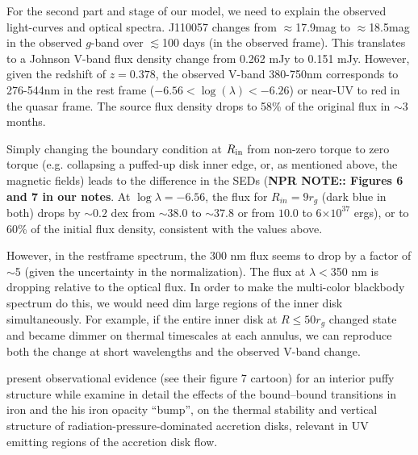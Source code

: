 \documentclass[11pt,a4paper]{article}
\begin{document}
For the second part and stage of our model, we need to explain the
observed light-curves and optical spectra. J110057 changes from
$\approx$17.9mag to $\approx$18.5mag in the observed $g$-band over
$\lesssim$100 days (in the observed frame).  This translates to a
Johnson V-band flux density change from 0.262 mJy to 0.151 mJy.
However, given the redshift of $z=0.378$, the observed V-band
380-750nm corresponds to 276-544nm in the rest frame ($-6.56 < \log
(\lambda) < -6.26$) or near-UV to red in the quasar frame. The source
flux density drops to 58\% of the original flux in $\sim$3 months.

Simply changing the boundary condition at $R_{\rm in}$ from non-zero
torque to zero torque (e.g. collapsing a puffed-up disk inner edge,
or, as mentioned above, the magnetic fields) leads to the difference
in the SEDs ({\bf NPR NOTE:: Figures 6 and 7 in our notes}.  At $\log
\lambda = −6.56$, the flux for $R_{in} = 9 r_{g}$ (dark blue in both)
drops by $\sim0.2$ dex from $\sim38.0$ to $\sim37.8 $ or from $10.0$
to 6$\times 10^{37}$ ergs), or to 60\% of the initial flux density,
consistent with the values above.

However, in the restframe spectrum, the 300 nm flux seems to drop by a
factor of $\sim$5 (given the uncertainty in the normalization). The
flux at $\lambda < $350 nm is dropping relative to the optical
flux. In order to make the multi-color blackbody spectrum do this, we
would need dim large regions of the inner disk simultaneously.  For
example, if the entire inner disk at $R \leq 50 r_{g}$ changed state
and became dimmer on thermal timescales at each annulus, we can
reproduce both the change at short wavelengths and the observed V-band
change.

\citet{Gardner_Done2017} present observational evidence (see their
figure 7 cartoon) for an interior puffy structure while
\citet{Jiang_Stone_Davis2016} examine in detail the effects of the
bound–bound transitions in iron and the his iron opacity ``bump'', on
the thermal stability and vertical structure of
radiation-pressure-dominated accretion disks, relevant in UV emitting
regions of the accretion disk flow.
\end{document}
